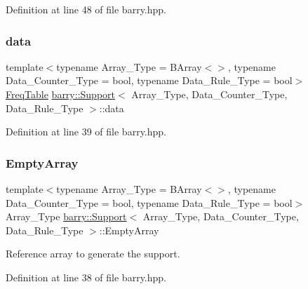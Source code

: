 Definition at line 48 of file barry.\+hpp.

\mbox{\label{classbarry_1_1_support_ab58b9801dcbb924d68fd18db0821de99}} 
\subsubsection{\texorpdfstring{data}{data}}
{\footnotesize\ttfamily template$<$typename Array\+\_\+\+Type  = B\+Array$<$$>$, typename Data\+\_\+\+Counter\+\_\+\+Type  = bool, typename Data\+\_\+\+Rule\+\_\+\+Type  = bool$>$ \\
\hyperlink{classbarry_1_1_freq_table}{Freq\+Table} \hyperlink{classbarry_1_1_support}{barry\+::\+Support}$<$ Array\+\_\+\+Type, Data\+\_\+\+Counter\+\_\+\+Type, Data\+\_\+\+Rule\+\_\+\+Type $>$\+::data}



Definition at line 39 of file barry.\+hpp.

\mbox{\label{classbarry_1_1_support_a2eec6569a9206965a679782f7acf12e5}} 
\subsubsection{\texorpdfstring{Empty\+Array}{EmptyArray}}
{\footnotesize\ttfamily template$<$typename Array\+\_\+\+Type  = B\+Array$<$$>$, typename Data\+\_\+\+Counter\+\_\+\+Type  = bool, typename Data\+\_\+\+Rule\+\_\+\+Type  = bool$>$ \\
Array\+\_\+\+Type \hyperlink{classbarry_1_1_support}{barry\+::\+Support}$<$ Array\+\_\+\+Type, Data\+\_\+\+Counter\+\_\+\+Type, Data\+\_\+\+Rule\+\_\+\+Type $>$\+::Empty\+Array}



Reference array to generate the support. 



Definition at line 38 of file barry.\+hpp.

\mbox{\label{classbarry_1_1_support_abdf54592050a1c0db0fc7b079a7f9703}} 
